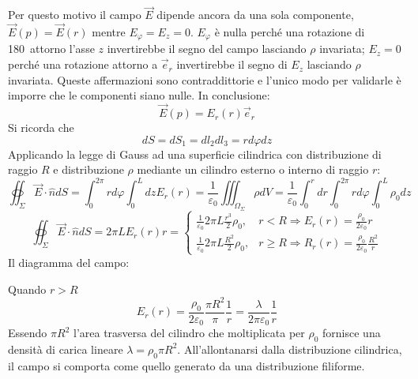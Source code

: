 Per questo motivo il campo $\vec{E}$ dipende ancora da una sola componente, $\vec{E}(p) = \vec{E}(r)$
mentre $E_\varphi = E_z = 0$. $E_\varphi$ è nulla perché una rotazione di 180\textdegree\ attorno
l'asse $z$ invertirebbe il segno del campo lasciando $\rho$ invariata; $E_z = 0$ perché una rotazione
attorno a $\vec{e}_r$ invertirebbe il segno di $E_z$ lasciando $\rho$ invariata.
Queste affermazioni sono contraddittorie e l'unico modo per validarle è imporre che le componenti
siano nulle. In conclusione:
$$
\vec{E}(p) = E_r(r)\vec{e}_r
$$
Si ricorda che
$$
dS = dS_1 = dl_2 dl_3 = rd\varphi dz
$$
Applicando la legge di Gauss ad una superficie cilindrica con distribuzione di raggio $R$ e distribuzione $\rho$ mediante un cilindro esterno o interno di raggio $r$:
$$
\oiint_\Sigma\vec{E}\cdot\hat{n}dS = \int_0^{2\pi}rd\varphi \int_0^L dz E_r(r) = \frac{1}{\varepsilon_0}
\iiint_{\Omega_\Sigma}\rho dV = \frac{1}{\varepsilon_0} \int_{0}^{r}dr\int_{0}^{2\pi} rd\varphi\int_0^L \rho_0 dz 
$$
$$
\oiint_\Sigma\vec{E}\cdot\hat{n}dS = 2\pi L E_r(r) r =
\begin{cases}
\frac{1}{\varepsilon_0} 2 \pi L \frac{r^3}{2}\rho_0, & r < R \Rightarrow E_r(r) = \frac{\rho_0}{2\varepsilon_0}r\\
\frac{1}{\varepsilon_0} 2 \pi L \frac{R^2}{2}\rho_0, & r\geq R \Rightarrow R_r(r) = \frac{\rho_0}{2\varepsilon_0} \frac{R^2}{r}
\end{cases}
$$
Il diagramma del campo:
\begin{center} %
\end{center}

Quando $r > R$ 
$$
E_r(r) = \frac{\rho_0}{2\varepsilon_0} \frac{\pi R^2}{\pi} \frac{1}{r} = 
\frac{\lambda}{2\pi\varepsilon_0} \frac{1}{r}
$$
Essendo $\pi R^2$ l'area trasversa del cilindro che moltiplicata per $\rho_0$ fornisce una densità di
carica lineare $\lambda = \rho_0 \pi R^2$. All'allontanarsi dalla distribuzione cilindrica, il campo si
comporta come quello generato da una distribuzione filiforme.

